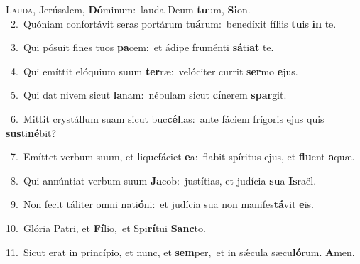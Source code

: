 \lettrine{\initial\textcolor{\initialcolor}{L}}{auda,} Jerúsalem, \textbf{Dó}\-minum:~\star lauda Deum \textbf{tu}\-um, \textbf{Si}\-on.\\
{\numbfont\textcolor{\numbcolor}{~2.}}~Quóniam confortávit seras portárum tu\-\textbf{á}\-rum:~\star benedíxit fíliis \textbf{tu}\-is \textbf{in} te.\par
{\numbfont\textcolor{\numbcolor}{~3.}}~Qui pósuit fines tuos \textbf{pa}\-cem:~\star et ádipe fruménti \textbf{sá}\-ti\textbf{at} te.\par
{\numbfont\textcolor{\numbcolor}{~4.}}~Qui emíttit elóquium suum \textbf{ter}\-ræ:~\star velóciter currit \textbf{ser}\-mo \textbf{e}\-jus.\par
{\numbfont\textcolor{\numbcolor}{~5.}}~Qui dat nivem sicut \textbf{la}\-nam:~\star nébulam sicut \textbf{cí}\-nerem \textbf{spar}\-git.\par
{\numbfont\textcolor{\numbcolor}{~6.}}~Mittit crystállum suam sicut buc\-\textbf{cél}\-las:~\star ante fáciem frígoris ejus quis \textbf{sus}\-ti\-\textbf{né}\-bit?\par
{\numbfont\textcolor{\numbcolor}{~7.}}~Emíttet verbum suum, et liquefáciet \textbf{e}\-a:~\star flabit spíritus ejus, et \textbf{flu}\-ent \textbf{a}\-quæ.\par
{\numbfont\textcolor{\numbcolor}{~8.}}~Qui annúntiat verbum suum \textbf{Ja}\-cob:~\star justítias, et judícia \textbf{su}\-a \textbf{Is}\-raël.\par
{\numbfont\textcolor{\numbcolor}{~9.}}~Non fecit táliter omni nati\-\textbf{ó}\-ni:~\star et judícia sua non manifes\-\textbf{tá}\-vit \textbf{e}\-is.\par
{\numbfont\textcolor{\numbcolor}{10.}}~Glória Patri, et \textbf{Fí}\-lio,~\star et Spi\-\textbf{rí}\-tui \textbf{Sanc}\-to.\par
{\numbfont\textcolor{\numbcolor}{11.}}~Sicut erat in princípio, et nunc, et \textbf{sem}\-per,~\star et in sǽcula sæcu\-\textbf{ló}\-rum. \textbf{A}\-men.\par
